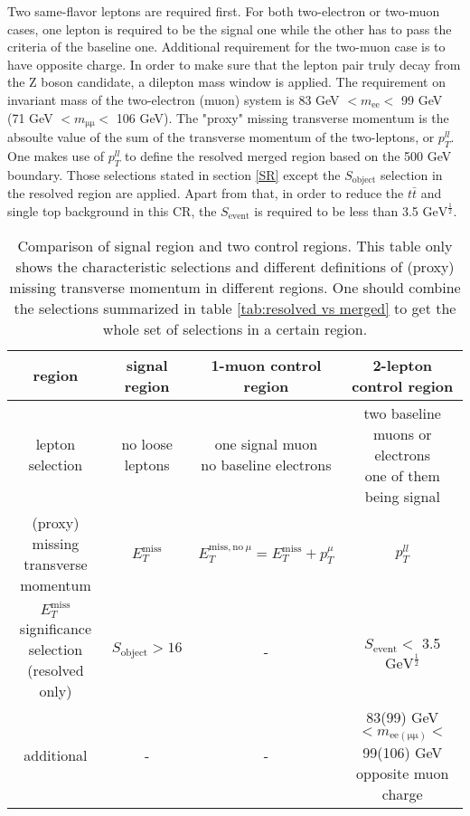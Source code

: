 \documentclass[class=NCU_thesis, crop=false]{standalone}
\begin{document}
		Two same-flavor leptons are required first. For both two-electron or two-muon cases, one lepton is required to be the signal one while the other has to pass the criteria of the baseline one. Additional requirement for the two-muon case is to have opposite charge. In order to make sure that the lepton pair truly decay from the Z boson candidate, a dilepton mass window is applied. The requirement on invariant mass of the two-electron (muon) system is 83 GeV $< m_{\mathrm{ee}} <$ 99 GeV (71 GeV $< m_{\mathrm{\mu \mu}} <$ 106 GeV). The "proxy" missing transverse momentum is the absoulte value of the sum of the transverse momentum of the two-leptons, or $p_T^{ll}$. One makes use of $p_T^{ll}$ to define the resolved merged region based on the 500 GeV boundary. Those selections stated in section \ref{SR} except the $S_{\mathrm{object}}$ selection in the resolved region are applied. Apart from that, in order to reduce the $t\bar{t}$ and single top background in this CR, the $S_{\mathrm{event}}$ is required to be less than 3.5 $\mathrm{GeV}^\frac{1}{2}$.
		
		\begin{table}[h]
			\caption{Comparison of signal region and two control regions. This table only shows the characteristic selections and different definitions of (proxy) missing transverse momentum in different regions. One should combine the selections summarized in table \ref{tab:resolved vs merged} to get the whole set of selections in a certain region.}
			\label{tab:SR vs CR}
			\begin{tabular}{|c|c|c|c|}
				\hline
				region & signal region & 1-muon control region & 2-lepton control region\\
				\hline
				lepton selection & no loose leptons & \shortstack{one signal muon\\no baseline electrons} & \shortstack{two baseline muons or electrons\\one of them being signal}\\
				\hline
				\shortstack{(proxy) missing\\transverse momentum} & $E_T^{\mathrm{miss}}$ & $E_T^{\mathrm{miss, no}\ \mu} = E_T^{\mathrm{miss}} + p_T^\mu$ & $p_T^{ll}$\\
				\hline
				\shortstack{$E_T^{\mathrm{miss}}$ significance\\selection (resolved only)} & $S_{\mathrm{object}} > 16$ & - & $S_{\mathrm{event}} <$ 3.5 $\mathrm{GeV}^\frac{1}{2}$\\
				\hline
				additional & - & - & \shortstack{83(99) GeV $< m_{\mathrm{ee\left(\mu \mu\right)}} <$ 99(106) GeV\\opposite muon charge}\\
				\hline
			\end{tabular}
		\end{table}
		
\end{document}
